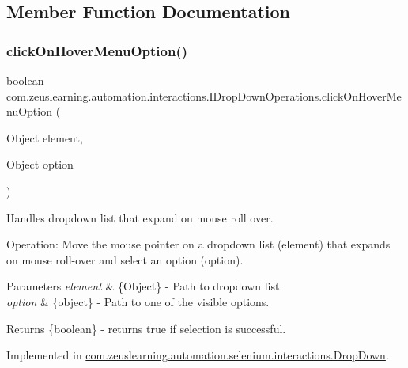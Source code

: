 \subsection{Member Function Documentation}
\hypertarget{interfacecom_1_1zeuslearning_1_1automation_1_1interactions_1_1IDropDownOperations_add4d06e1de28d263d9451d67936c0324}{}\label{interfacecom_1_1zeuslearning_1_1automation_1_1interactions_1_1IDropDownOperations_add4d06e1de28d263d9451d67936c0324} 
\subsubsection{\texorpdfstring{click\+On\+Hover\+Menu\+Option()}{clickOnHoverMenuOption()}}
{\footnotesize\ttfamily boolean com.\+zeuslearning.\+automation.\+interactions.\+I\+Drop\+Down\+Operations.\+click\+On\+Hover\+Menu\+Option (\begin{DoxyParamCaption}\item[{Object}]{element,  }\item[{Object}]{option }\end{DoxyParamCaption})}

Handles dropdown list that expand on mouse roll over.

Operation\+: Move the mouse pointer on a dropdown list (\textquotesingle{}element\textquotesingle{}) that expands on mouse roll-\/over and select an option ({\ttfamily option}). 


\begin{DoxyParams}{Parameters}
{\em element} & \{Object\} -\/ Path to dropdown list. \\
\hline
{\em option} & \{object\} -\/ Path to one of the visible options.\\
\hline
\end{DoxyParams}
\begin{DoxyReturn}{Returns}
\{boolean\} -\/ returns {\ttfamily true} if selection is successful. 
\end{DoxyReturn}


Implemented in \hyperlink{classcom_1_1zeuslearning_1_1automation_1_1selenium_1_1interactions_1_1DropDown_ab27460ee736614dfc1c93b57b98aadc2}{com.\+zeuslearning.\+automation.\+selenium.\+interactions.\+Drop\+Down}.

